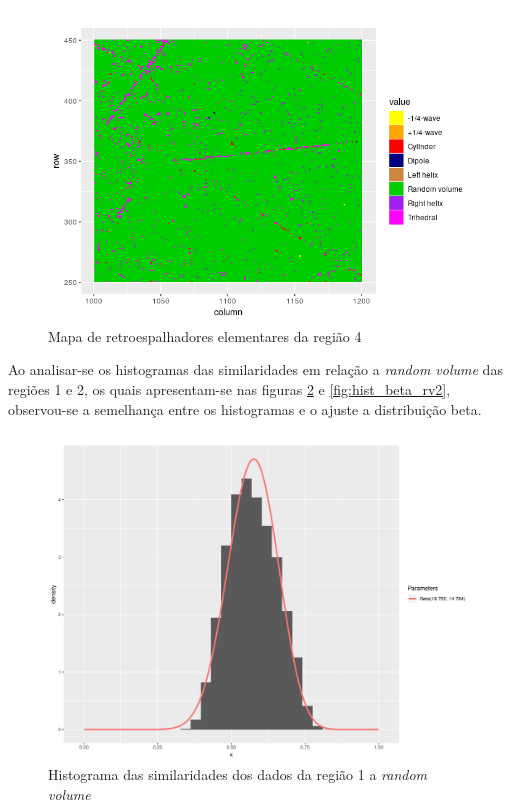 \documentclass[12pt]{article}
\begin{document}
\begin{figure}[!h]

  \centering
  \includegraphics[width=\linewidth]{../../Images/Report_19_02_27/scatterer_map_region4.png}
  \caption{Mapa de retroespalhadores elementares da região 4}
  \label{fig:scatterer_map4}

\end{figure}

\newpage

Ao analisar-se os histogramas das similaridades em relação a \textit{random volume} das regiões 1 e 2, os quais apresentam-se nas figuras \ref{fig:hist_beta_rv1} e \ref{fig:hist_beta_rv2}, observou-se a semelhança entre os histogramas e o ajuste a distribuição beta. 

\begin{figure}[!h]

  \centering
  \includegraphics[width=0.8\linewidth]{../../Figures/Report_19_02_27/hist_rv_beta_region1.pdf}
  \caption{Histograma das similaridades dos dados da região 1 a \textit{random volume}}
  \label{fig:hist_beta_rv1}

\end{figure}
\end{document}
